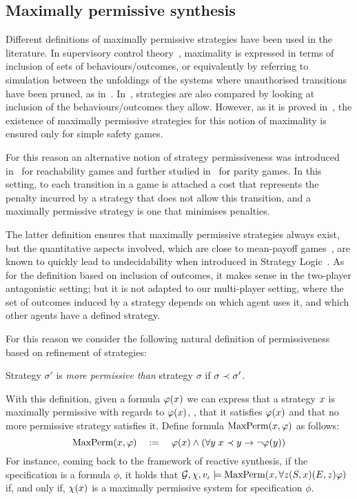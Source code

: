 \subsection{Maximally permissive synthesis}
\label{sec-max-perm}

Different definitions of maximally permissive strategies have been used
in the literature. In supervisory control
theory~\cite{ramadge1987supervisory}, maximality is expressed in terms
of inclusion of sets of behaviours/outcomes, or equivalently by
referring to simulation between the unfoldings of the systems where
unauthorised transitions have been pruned, as
in~\cite{pinchinat2005you}.  In~\cite{bernet2002permissive},
strategies are also compared by looking at inclusion of the behaviours/outcomes they allow. However, as it is proved
in~\cite{bernet2002permissive}, the existence of maximally permissive
strategies for this notion of maximality is ensured only for simple
safety games.

For this reason an alternative notion of strategy
permissiveness was introduced in~\cite{bouyer2009measuring} for
reachability games and further studied in~\cite{bouyer2011measuring}
for parity games. In this setting, to each transition in a game is
attached a cost that represents the penalty incurred by a strategy
that does not allow this transition, and a maximally permissive
strategy is one that minimises penalties.

The latter definition ensures that
maximally permissive strategies always exist, but the quantitative
aspects involved, which are close to mean-payoff
games~\cite{ehrenfeucht1979positional,gurvich1988cyclic}, are known to
quickly lead to undecidability when introduced in Strategy Logic~\cite{gardy2017semantics}.
As for the definition based on inclusion of outcomes, it makes sense in the
two-player antagonistic setting; but it is not adapted to our multi-player setting, where the set of
outcomes induced by a strategy depends on which agent uses it, and
which other agents have a defined strategy.

For this reason we consider the following natural definition of permissiveness based on refinement
of strategies:
\begin{definition}
  \label{def-permissive}
  Strategy $\sigma'$ is \emph{more permissive than} strategy $\sigma$
  if $\sigma\prec\sigma'$. 
\end{definition}

With this definition, given a formula $\varphi(x)$ we can express that a strategy $x$
  is maximally permissive with regards to  $\varphi(x)$, \ie, that
  it satisfies $\varphi(x)$ and that no more permissive strategy
  satisfies it. Define formula $\text{MaxPerm}(x,\varphi)$ as
  follows:
  \[\text{MaxPerm}(x,\varphi) \quad := \quad \varphi(x) \wedge (\forall y \;
    x \prec y \to \neg \varphi(y))\]
  For instance, coming back to the framework of reactive synthesis, if
the specification is a  \CTLs formula $\phi$, it holds that
  $\CGS,\assign,\pos_\init\models \maxperm(\var,\forall \varc
  \bind[S]{\var}\bind[E]{\varc}\phi)$ if, and only
  if, $\chi(x)$ is a maximally permissive system for
  specification $\phi$.

